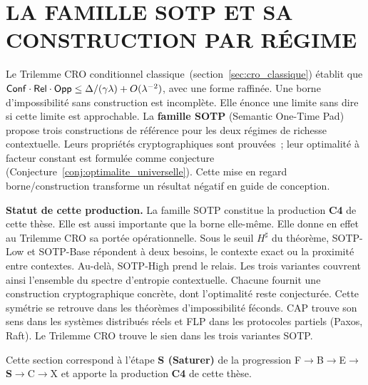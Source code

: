 
\section{LA FAMILLE SOTP ET SA CONSTRUCTION PAR R\'EGIME}
\label{sec:sotp_construction}
\begin{sloppypar}
Le Trilemme CRO conditionnel classique~(section~\ref{sec:cro_classique}) \'etablit
que $\mathsf{Conf} \cdot \mathsf{Rel} \cdot \mathsf{Opp} \leq \Delta/(\gamma\lambda) +
O(\lambda^{-2})$, avec une forme raffin\'ee. Une borne d'impossibilit\'e sans
construction est incompl\`ete. Elle \'enonce une limite sans dire si
cette limite est approchable. La \textbf{famille SOTP} (Semantic One-Time
Pad) propose trois constructions de r\'ef\'erence pour les deux r\'egimes de richesse
contextuelle. Leurs propri\'et\'es cryptographiques sont prouv\'ees~; leur
optimalit\'e \`a facteur constant est formul\'ee comme conjecture
(Conjecture~\ref{conj:optimalite_universelle}). Cette mise en regard
borne/construction transforme un r\'esultat n\'egatif en guide de conception.

\medskip
\noindent\textbf{Statut de cette production.} La famille SOTP
constitue la production \textbf{C4} de cette th\`ese. Elle est
aussi importante que la borne elle-m\^eme. Elle
donne en effet au Trilemme CRO sa port\'ee op\'erationnelle. Sous le seuil $H^\sharp$ du th\'eor\`eme,
SOTP-Low et SOTP-Base r\'epondent \`a deux besoins, le contexte exact ou la proximit\'e entre
contextes. Au-del\`a, SOTP-High prend le relais. Les trois variantes couvrent ainsi l'ensemble du
spectre d'entropie contextuelle. Chacune fournit une construction cryptographique concr\`ete, dont
l'optimalit\'e reste conjectur\'ee. Cette sym\'etrie
se retrouve dans les th\'eor\`emes d'impossibilit\'e f\'econds. CAP trouve
son sens dans les syst\`emes distribu\'es r\'eels et FLP dans les protocoles
partiels (Paxos, Raft). Le Trilemme CRO trouve le sien dans les trois
variantes SOTP.

Cette section correspond \`a l'\'etape \textbf{S (Saturer)} de la progression
F$\to$B$\to$E$\to$\textbf{S}$\to$C$\to$X et apporte la production \textbf{C4}
de cette th\`ese.


\end{sloppypar}
